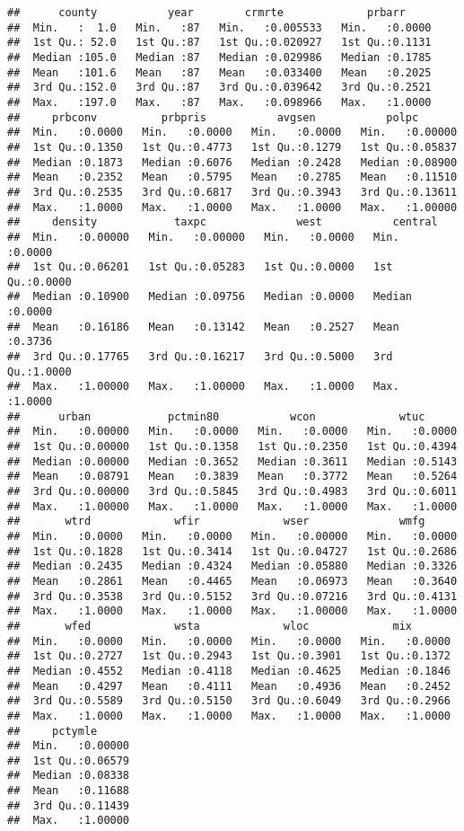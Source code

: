 \documentclass[]{article}
\begin{document}
\begin{verbatim}
##      county           year        crmrte             prbarr      
##  Min.   :  1.0   Min.   :87   Min.   :0.005533   Min.   :0.0000  
##  1st Qu.: 52.0   1st Qu.:87   1st Qu.:0.020927   1st Qu.:0.1131  
##  Median :105.0   Median :87   Median :0.029986   Median :0.1785  
##  Mean   :101.6   Mean   :87   Mean   :0.033400   Mean   :0.2025  
##  3rd Qu.:152.0   3rd Qu.:87   3rd Qu.:0.039642   3rd Qu.:0.2521  
##  Max.   :197.0   Max.   :87   Max.   :0.098966   Max.   :1.0000  
##     prbconv          prbpris           avgsen           polpc        
##  Min.   :0.0000   Min.   :0.0000   Min.   :0.0000   Min.   :0.00000  
##  1st Qu.:0.1350   1st Qu.:0.4773   1st Qu.:0.1279   1st Qu.:0.05837  
##  Median :0.1873   Median :0.6076   Median :0.2428   Median :0.08900  
##  Mean   :0.2352   Mean   :0.5795   Mean   :0.2785   Mean   :0.11510  
##  3rd Qu.:0.2535   3rd Qu.:0.6817   3rd Qu.:0.3943   3rd Qu.:0.13611  
##  Max.   :1.0000   Max.   :1.0000   Max.   :1.0000   Max.   :1.00000  
##     density            taxpc              west           central      
##  Min.   :0.00000   Min.   :0.00000   Min.   :0.0000   Min.   :0.0000  
##  1st Qu.:0.06201   1st Qu.:0.05283   1st Qu.:0.0000   1st Qu.:0.0000  
##  Median :0.10900   Median :0.09756   Median :0.0000   Median :0.0000  
##  Mean   :0.16186   Mean   :0.13142   Mean   :0.2527   Mean   :0.3736  
##  3rd Qu.:0.17765   3rd Qu.:0.16217   3rd Qu.:0.5000   3rd Qu.:1.0000  
##  Max.   :1.00000   Max.   :1.00000   Max.   :1.0000   Max.   :1.0000  
##      urban            pctmin80           wcon             wtuc       
##  Min.   :0.00000   Min.   :0.0000   Min.   :0.0000   Min.   :0.0000  
##  1st Qu.:0.00000   1st Qu.:0.1358   1st Qu.:0.2350   1st Qu.:0.4394  
##  Median :0.00000   Median :0.3652   Median :0.3611   Median :0.5143  
##  Mean   :0.08791   Mean   :0.3839   Mean   :0.3772   Mean   :0.5264  
##  3rd Qu.:0.00000   3rd Qu.:0.5845   3rd Qu.:0.4983   3rd Qu.:0.6011  
##  Max.   :1.00000   Max.   :1.0000   Max.   :1.0000   Max.   :1.0000  
##       wtrd             wfir             wser              wmfg       
##  Min.   :0.0000   Min.   :0.0000   Min.   :0.00000   Min.   :0.0000  
##  1st Qu.:0.1828   1st Qu.:0.3414   1st Qu.:0.04727   1st Qu.:0.2686  
##  Median :0.2435   Median :0.4324   Median :0.05880   Median :0.3326  
##  Mean   :0.2861   Mean   :0.4465   Mean   :0.06973   Mean   :0.3640  
##  3rd Qu.:0.3538   3rd Qu.:0.5152   3rd Qu.:0.07216   3rd Qu.:0.4131  
##  Max.   :1.0000   Max.   :1.0000   Max.   :1.00000   Max.   :1.0000  
##       wfed             wsta             wloc             mix        
##  Min.   :0.0000   Min.   :0.0000   Min.   :0.0000   Min.   :0.0000  
##  1st Qu.:0.2727   1st Qu.:0.2943   1st Qu.:0.3901   1st Qu.:0.1372  
##  Median :0.4552   Median :0.4118   Median :0.4625   Median :0.1846  
##  Mean   :0.4297   Mean   :0.4111   Mean   :0.4936   Mean   :0.2452  
##  3rd Qu.:0.5589   3rd Qu.:0.5150   3rd Qu.:0.6049   3rd Qu.:0.2966  
##  Max.   :1.0000   Max.   :1.0000   Max.   :1.0000   Max.   :1.0000  
##     pctymle       
##  Min.   :0.00000  
##  1st Qu.:0.06579  
##  Median :0.08338  
##  Mean   :0.11688  
##  3rd Qu.:0.11439  
##  Max.   :1.00000
\end{verbatim}
\end{document}
